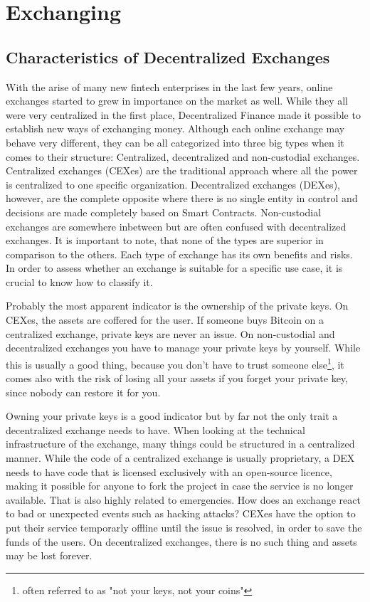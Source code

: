 \section{Exchanging}
\subsection{Characteristics of Decentralized Exchanges}
With the arise of many new fintech enterprises in the last few years, online exchanges started to grew in importance on the market as well. While they all were very centralized in the first place, Decentralized Finance made it possible to establish new ways of exchanging money. Although each online exchange may behave very different, they can be all categorized into three big types when it comes to their structure: Centralized, decentralized and non-custodial exchanges. Centralized exchanges (CEXes) are the traditional approach where all the power is centralized to one specific organization. Decentralized exchanges (DEXes), however, are the complete opposite where there is no single entity in control and decisions are made completely based on Smart Contracts. Non-custodial exchanges are somewhere inbetween but are often confused with decentralized exchanges. It is important to note, that none of the types are superior in comparison to the others. Each type of exchange has its own benefits and risks. In order to assess whether an exchange is suitable for a specific use case, it is crucial to know how to classify it.

Probably the most apparent indicator is the ownership of the private keys. On CEXes, the assets are coffered for the user. If someone buys Bitcoin on a centralized exchange, private keys are never an issue. On non-custodial and decentralized exchanges you have to manage your private keys by yourself. While this is usually a good thing, because you don't have to trust someone else\footnote{often referred to as "not your keys, not your coins"}, it comes also with the risk of losing all your assets if you forget your private key, since nobody can restore it for you.

Owning your private keys is a good indicator but by far not the only trait a decentralized exchange needs to have. When looking at the technical infrastructure of the exchange, many things could be structured in a centralized manner. While the code of a centralized exchange is usually proprietary, a DEX needs to have code that is licensed exclusively with an open-source licence, making it possible for anyone to fork the project in case the service is no longer available. That is also highly related to emergencies. How does an exchange react to bad or unexpected events such as hacking attacks? CEXes have the option to put their service temporarly offline until the issue is resolved, in order to save the funds of the users. On decentralized exchanges, there is no such thing and assets may be lost forever.

